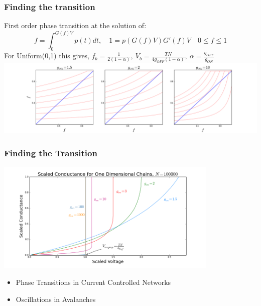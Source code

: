 \documentclass[mathserif]{beamer}
\begin{document}
\begin{frame}
\frametitle{Finding the transition}
First order phase transition at the solution of:
$$f = \int_0^{G(f)V} p(t) dt,  \quad 1 = p(G(f)V)G'(f)V \quad 0 \le f \le 1$$
For Uniform(0,1) this gives, 
$f_b = \frac{1}{2(1-\alpha)}, \: V_b = \frac{TN}{4g_{OFF}(1-\alpha)},
 \: \alpha = \frac{g_{OFF}}{g_{ON}}$
\centering
\includegraphics[width=\textwidth]{SC_1D_Uniform01.png}
\end{frame}

\begin{frame}
\frametitle{Finding the Transition}
\centering
\includegraphics[width=0.8\textwidth]{1D_Cond.png}

\end{frame}

\begin{frame}
\begin{itemize}
\item Phase Transitions in Current Controlled Networks
\item Oscillations in Avalanches
\end{itemize}
\end{frame}
\end{document}
